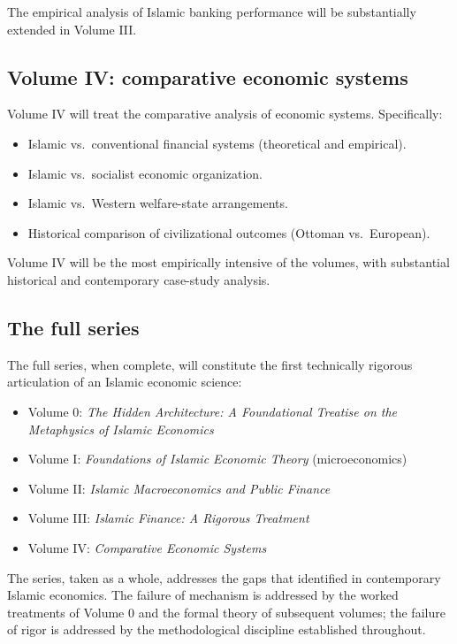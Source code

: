 The empirical analysis of Islamic banking performance will be
substantially extended in Volume III.

\subsection{Volume IV: comparative economic systems}

Volume IV will treat the comparative analysis of economic
systems. Specifically:

\begin{itemize}[leftmargin=2em]
    \item Islamic vs.\ conventional financial systems
    (theoretical and empirical).
    \item Islamic vs.\ socialist economic organization.
    \item Islamic vs.\ Western welfare-state arrangements.
    \item Historical comparison of civilizational outcomes
    (Ottoman vs.\ European).
\end{itemize}

Volume IV will be the most empirically intensive of the volumes,
with substantial historical and contemporary case-study analysis.

\subsection{The full series}

The full series, when complete, will constitute the first
technically rigorous articulation of an Islamic economic science:

\begin{itemize}[leftmargin=2em]
    \item Volume 0: \emph{The Hidden Architecture: A Foundational
    Treatise on the Metaphysics of Islamic Economics}
    \item Volume I: \emph{Foundations of Islamic Economic Theory}
    (microeconomics)
    \item Volume II: \emph{Islamic Macroeconomics and Public Finance}
    \item Volume III: \emph{Islamic Finance: A Rigorous Treatment}
    \item Volume IV: \emph{Comparative Economic Systems}
\end{itemize}

The series, taken as a whole, addresses the gaps that
 identified in contemporary Islamic
economics. The failure of mechanism is addressed by the
worked treatments of Volume 0 and the formal theory of subsequent
volumes; the failure of rigor is addressed by the methodological
discipline established throughout.

